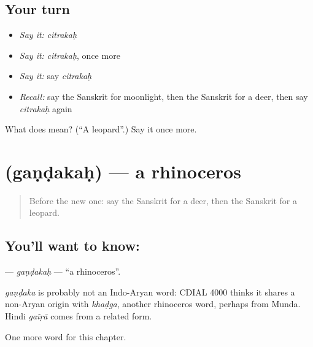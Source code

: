 \subsection*{Your turn}
\begin{itemize}
\raggedright
  \item \emph{Say it:} \emph{citrakaḥ}
  \item \emph{Say it:} \emph{citrakaḥ}, once more
  \item \emph{Say it:} say \emph{citrakaḥ}
  \item \emph{Recall:} say the Sanskrit for moonlight, then the Sanskrit for a deer, then say \emph{citrakaḥ} again
\end{itemize}

\begin{tcolorbox}[breakable,colback=teal!4,colframe=teal!35!black,title={Before you move on}]
What does  mean? (\textquotedblleft{}A leopard\textquotedblright{}.) Say it once more.
\end{tcolorbox}
\section[\texorpdfstring{\sk{गण्डकः} (gaṇḍakaḥ)}{गण्डकः (gaṇḍakaḥ)}]{ (gaṇḍakaḥ) — a rhinoceros}

\label{lesson:SA-C198-gandakah}



\begin{quote}
Before the new one: say the Sanskrit for a deer, then the Sanskrit for a leopard.
\end{quote}

\subsection*{You'll want to know: }
\textbf{} — \emph{gaṇḍakaḥ} — \textquotedblleft{}a rhinoceros\textquotedblright{}.

\begin{cousinweb}
\emph{gaṇḍaka} is probably not an Indo-Aryan word: CDIAL 4000 thinks it shares a non-Aryan origin with \emph{khaḍga}, another rhinoceros word, perhaps from Munda. Hindi \emph{gaĩṛā} comes from a related form.
\end{cousinweb}

\begin{grammarlens}[title={What you've built}]
One more word for this chapter.
\end{grammarlens}

